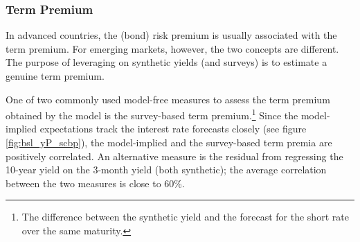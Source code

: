 {\subsubsection{Term Premium} \label{sec:TP}
\iftoggle{toclinks}{\gototoc}{} %

In advanced countries, the (bond) risk premium is usually associated with the term premium.
For emerging markets, however, the two concepts are different.
The purpose of leveraging on synthetic yields (and surveys) is to estimate a genuine term premium.

One of two commonly used model-free measures to assess the term premium obtained by the model is the survey-based term premium.\footnote{ The difference between the synthetic yield and the forecast for the short rate over the same maturity.}
Since the model-implied expectations track the interest rate forecasts closely (see figure \ref{fig:bsl_yP_scbp}), the model-implied and the survey-based term premia are positively correlated.
An alternative measure is the residual from regressing the 10-year yield on the 3-month yield (both synthetic); the average correlation between the two measures is close to 60\%.

}
